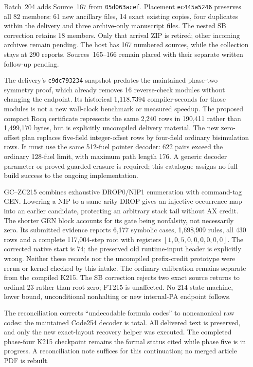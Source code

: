 \documentclass[11pt]{article}
\begin{document}
{Batch~204 adds Source~167 from \texttt{05d063acef}. Placement
\texttt{ec445a5246} preserves all 82 members: 61 new ancillary files,
14 exact existing copies, four duplicates within the delivery and three
archive-only manuscript files. The nested SB correction retains 18 members.
Only that arrival ZIP is retired; other incoming archives remain pending.
The host has 167 numbered sources, while the collection stays at 290 reports.
Sources~165--166 remain placed with their separate written follow-up pending.

The delivery's \texttt{c9dc793234} snapshot predates the maintained phase-two
symmetry proof, which already removes 16 reverse-check modules without changing
the endpoint. Its historical 1,118.7394 compiler-seconds for those modules
is not a new wall-clock benchmark or measured speedup. The proposed compact
Rocq certificate represents the same 2,240 rows in 190,411 rather than
1,499,170 bytes, but is explicitly uncompiled delivery material. The new
zero-offset plan replaces five-field integer-offset rows by four-field ordinary
bisimulation rows. It must use the same 512-fuel pointer decoder: 622 pairs
exceed the ordinary 128-fuel limit, with maximum path length 176. A generic
decoder parameter or proved guarded erasure is required; this catalogue
assigns no full-build success to the ongoing implementation.

GC--ZC215 combines exhaustive DROP0/NIP1 enumeration with command-tag GEN.
Lowering a NIP to a same-arity DROP gives an injective occurrence map into an
earlier candidate, protecting an arbitrary stack tail without AX credit.
The shorter GEN block accounts for its gate being nonfalsity, not necessarily
zero. Its submitted evidence reports 6,177 symbolic cases, 1,698,909 rules,
all 430 rows and a complete 117,004-step root with registers
$[1,0,5,0,0,0,0,0,0]$. The corrected native start is 74; the preserved old
runtime-input header is explicitly wrong. Neither these records nor the
uncompiled prefix-credit prototype were rerun or kernel checked by this
intake. The ordinary calibration remains separate from the compiled K215.
The SB correction rejects two exact source returns to ordinal 23 rather than
root zero; FT215 is unaffected. No 214-state machine, lower bound,
unconditional nonhalting or new internal-PA endpoint follows.

The reconciliation corrects ``undecodable formula codes'' to noncanonical
raw codes: the maintained Code254 decoder is total. All delivered text is
preserved, and only the new exact-layout recovery helper was executed.
The completed phase-four K215 checkpoint remains the formal status cited
while phase five is in progress. A reconciliation note suffices for this
continuation; no merged article PDF is rebuilt.

}
\end{document}
